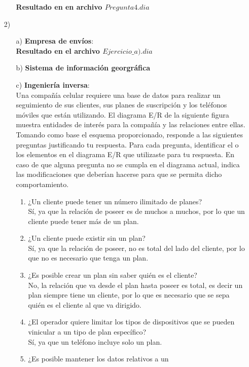 \documentclass[a4paper, 12pt]{report}
\begin{document}
\begin{enumerate}
\begin{enumerate}
{    \textbf{Resultado en en archivo 
    $Pregunta4.dia$}
 }
\end{enumerate}
	\item[2)]{}
\begin{enumerate}
    \item[a)]\textbf{Empresa de envíos}:\\
    \textbf{Resultado en el archivo $Ejercicio \_ a).dia$}
    \item[b)]\textbf{Sistema de información georgráfica }
    \item[c)]\textbf{Ingeniería inversa}:\\
		Una compañía celular requiere una base de datos para realizar
		un seguimiento de sus clientes, sus planes de suscripción y 
		los teléfonos móviles que  están  utilizando.  El diagrama 
		E/R de  la  siguiente figura  muestra  entidades  de  interés  
		para  la  compañía  y  las  relaciones  entre  ellas.  
		Tomando  como base el esquema proporcionado, responde a las 
		siguientes preguntas justificando tu respuesta. Para cada 
		pregunta, identificar el o los elementos en el diagrama E/R 
		que utilizaste para tu respuesta. En caso de que alguna 
		pregunta no se cumpla en el diagrama actual, indica las 
		modificaciones que deberían hacerse para que se permita dicho 
		comportamiento.\\
		\begin{enumerate}
			\item ¿Un cliente puede tener un número ilimitado de planes?\\
			Sí, ya que la relación de poseer es de muchos a muchos, por
			lo que un cliente puede tener más de un plan.
			\item ¿Un cliente puede existir sin un plan?\\
			Sí, ya que la relación de poseer, no es total del lado del 
			cliente, por lo que no es necesario que tenga un plan.
			\item ¿Es posible crear un plan sin saber quién es el 
			cliente?\\
			No, la relación que va desde el plan hasta poseer es total,
			es decir un plan siempre tiene un cliente, por lo que es
			necesario que se sepa quién es el cliente al que va 
			dirigido.
			\item ¿El operador quiere limitar los tipos de dispositivos
			que se pueden vinicular a un tipo de plan específico?\\
			Sí, ya que un teléfono incluye solo un plan.
			\item ¿Es posible mantener los datos relativos a un 

\end{enumerate}
\end{enumerate}
\end{enumerate}
\end{document}
